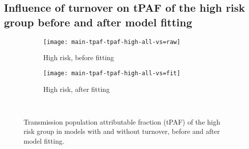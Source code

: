 \subsection{Influence of turnover on tPAF of the high risk group before and after model fitting}
\begin{figure}[H]
  \begingroup\centering
  \begin{subfigure}{0.4\linewidth}
    \texttt{[image: main-tpaf-tpaf-high-all-vs=raw]}
    \caption{High risk, before fitting}
    \label{fig:tpaf-high-raw}
  \end{subfigure}
  \begin{subfigure}{0.4\linewidth}
    \texttt{[image: main-tpaf-tpaf-high-all-vs=fit]}
    \caption{High risk, after fitting}
    \label{fig:tpaf-high-fit}
  \end{subfigure}
  \\\endgroup
  \caption{Transmission population attributable fraction (tPAF)
    of the high risk group in models with and without turnover,
    before and after model fitting.}
\end{figure}
